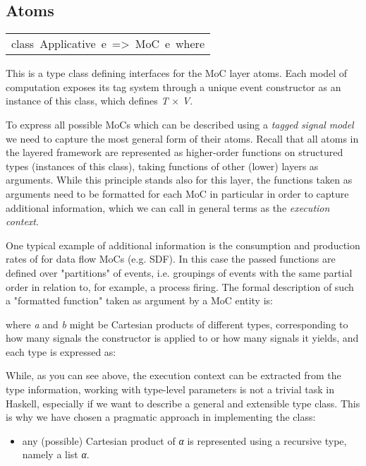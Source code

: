 \subsection{Atoms}
\begin{haddockdesc}
\item[\begin{tabular}{@{}l}
class\ Applicative\ e\ =>\ MoC\ e\ where
\end{tabular}]\haddockbegindoc
This is a type class defining interfaces for the MoC layer
 atoms. Each model of computation exposes its tag system through a
 unique event constructor as an instance of this class, which
 defines \emph{T} × \emph{V}.\par
 To express all possible MoCs which can be described using
 a \emph{tagged} \emph{signal} \emph{model} we need to capture the most general
 form of their atoms. Recall that all atoms in the layered framework
 are represented as higher-order functions on structured types
 (instances of this class), taking functions of other (lower) layers
 as arguments. While this principle stands also for this layer, the
 functions taken as arguments need to be formatted for each MoC in
 particular in order to capture additional information, which we can
 call in general terms as the \emph{execution context}.\par
One typical example of additional information is the consumption
 and production rates of for data flow MoCs (e.g. SDF). In this case
 the passed functions are defined over "partitions" of events,
 i.e. groupings of events with the same partial order in relation
 to, for example, a process firing. The formal description of such a
 "formatted function" taken as argument by a MoC entity is:\par
{}\par
where \emph{a} and \emph{b} might be Cartesian products of different types,
 corresponding to how many signals the constructor is applied to or
 how many signals it yields, and each type is expressed as:\par
{}\par
While, as you can see above, the execution context can be extracted
 from the type information, working with type-level parameters is
 not a trivial task in Haskell, especially if we want to describe a
 general and extensible type class. This is why we have chosen a
 pragmatic approach in implementing the  class:\par
\begin{itemize}
\item
any (possible) Cartesian product of \emph{α} is represented using
 a recursive type, namely a list {}\emph{α}{}.\par


\end{itemize}
\end{haddockdesc}

